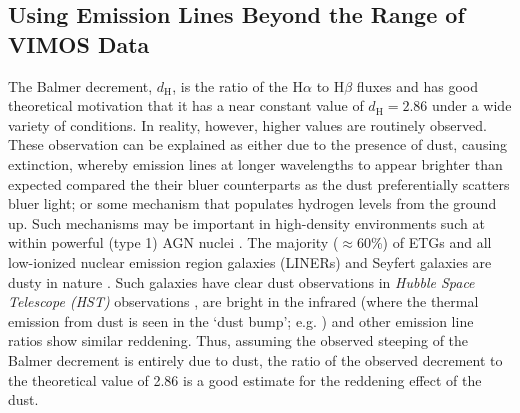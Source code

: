 


	\subsection{Using Emission Lines Beyond the Range of VIMOS Data}
		\label{subsec:Ndec}

		The Balmer decrement, $d_\mathrm{H}$, is the ratio of the H$\alpha$ to H$\beta$ fluxes and has good theoretical motivation that it has a near constant value of $d_\mathrm{H} = 2.86$ under a wide variety of conditions. In reality, however, higher values are routinely observed. These observation can be explained as either due to the presence of dust, causing extinction, whereby emission lines at longer wavelengths to appear brighter than expected compared the their bluer counterparts as the dust preferentially scatters bluer light; or some mechanism that populates hydrogen levels from the ground up. Such mechanisms may be important in high-density environments such at within powerful (type 1) AGN nuclei \citep[e.g.][]{Shields1974, Netzer1975}. The majority ($\approx 60$\%) of ETGs and all low-ionized nuclear emission region galaxies (LINERs) and Seyfert galaxies are dusty in nature \citep[e.g.][]{Martini2013}. Such galaxies have clear dust observations in \textit{Hubble Space Telescope (HST)} observations \citep[e.g.][]{Martini2013}, are bright in the infrared (where the thermal emission from dust is seen in the `dust bump'; e.g. \citealt{Jura1987, Knapp1992}) and other emission line ratios \citep[e.g.  in ][]{Wampler1968} show similar reddening. Thus, assuming the observed steeping of the Balmer decrement is entirely due to dust, the ratio of the observed decrement to the theoretical value of 2.86 is a good estimate for the reddening effect of the dust.

